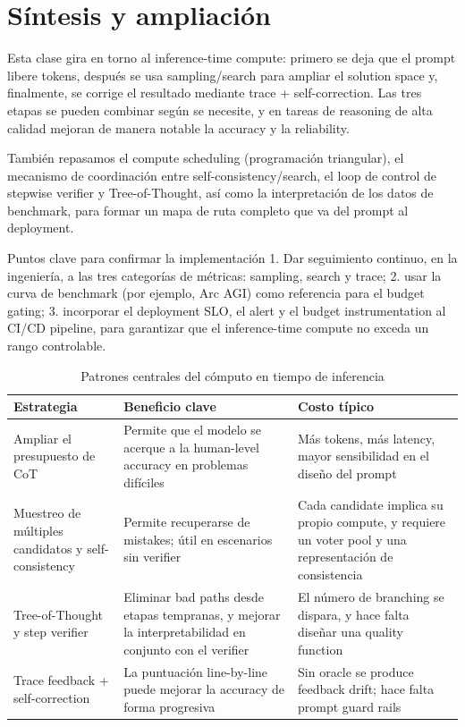 \section{Síntesis y ampliación}
Esta clase gira en torno al inference-time compute: primero se deja que el prompt libere tokens, después se usa sampling/search para ampliar el solution space y, finalmente, se corrige el resultado mediante trace + self-correction. Las tres etapas se pueden combinar según se necesite, y en tareas de reasoning de alta calidad mejoran de manera notable la accuracy y la reliability.

También repasamos el compute scheduling (programación triangular), el mecanismo de coordinación entre self-consistency/search, el loop de control de stepwise verifier y Tree-of-Thought, así como la interpretación de los datos de benchmark, para formar un mapa de ruta completo que va del prompt al deployment.

\begin{importantbox}{Puntos clave para confirmar la implementación}
1. Dar seguimiento continuo, en la ingeniería, a las tres categorías de métricas: sampling, search y trace; 2. usar la curva de benchmark (por ejemplo, Arc AGI) como referencia para el budget gating; 3. incorporar el deployment SLO, el alert y el budget instrumentation al CI/CD pipeline, para garantizar que el inference-time compute no exceda un rango controlable.
\end{importantbox}

\begin{table}[H]
\centering
\caption{Patrones centrales del cómputo en tiempo de inferencia}
\begin{tabular}{p{}p{}p{}}
\toprule
Estrategia & Beneficio clave & Costo típico \\
\midrule
Ampliar el presupuesto de CoT & Permite que el modelo se acerque a la human-level accuracy en problemas difíciles & Más tokens, más latency, mayor sensibilidad en el diseño del prompt \\
Muestreo de múltiples candidatos y self-consistency & Permite recuperarse de mistakes; útil en escenarios sin verifier & Cada candidate implica su propio compute, y requiere un voter pool y una representación de consistencia \\
Tree-of-Thought y step verifier & Eliminar bad paths desde etapas tempranas, y mejorar la interpretabilidad en conjunto con el verifier & El número de branching se dispara, y hace falta diseñar una quality function \\
Trace feedback + self-correction & La puntuación line-by-line puede mejorar la accuracy de forma progresiva & Sin oracle se produce feedback drift; hace falta prompt guard rails \\
\bottomrule
\end{tabular}
\end{table}

